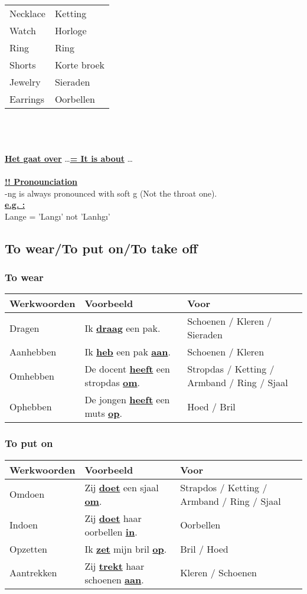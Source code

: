 \documentclass[a4paper,14pt]{extarticle}
\newcommand{\attention}[1]{\underline{\textbf{!! #1}}}
\newcommand{\emp}[1]{\underline{\textbf{#1}}}
\begin{document}
\begin{paracol}{2}
\begin{tabularx}{200pt}{ p{100pt} p{100pt} }
 Necklace & Ketting \\
 Watch & Horloge \\
 Ring & Ring \\
 Shorts & Korte broek \\
 Jewelry & Sieraden \\
 Earrings & Oorbellen \\
\end{tabularx} \\ \\ \\
\emp{Het gaat over} \dots \emp{= It is about} \dots \\ \\
\attention{Pronounciation} \\ 
-ng is always pronounced with soft g (Not the throat one). \\
\emp{e.g. :} \\
Lange = 'Langı' not 'Lanhgı' \\
\end{paracol}
\subsection{To wear/To put on/To take off}
\subsubsection{To wear}
\begin{tabularx}{\textwidth}{ p{} p{} p{} }
 \hline
 Werkwoorden & Voorbeeld & Voor \\
 \hline
 Dragen & Ik \emp{draag} een pak. & Schoenen / Kleren / Sieraden \\
 Aanhebben & Ik \emp{heb} een pak \emp{aan}. & Schoenen / Kleren \\
 Omhebben & De docent \emp{heeft} een stropdas \emp{om}. & Stropdas / Ketting / Armband / Ring / Sjaal \\
 Ophebben & De jongen \emp{heeft} een muts \emp{op}. & Hoed / Bril \\
\end{tabularx}
\newpage
\subsubsection{To put on}
\begin{tabularx}{\textwidth}{ p{} p{} p{} }
 \hline
 Werkwoorden & Voorbeeld & Voor \\
 \hline
 Omdoen & Zij \emp{doet} een sjaal \emp{om}. & Strapdos / Ketting / Armband / Ring / Sjaal \\
 Indoen & Zij \emp{doet} haar oorbellen \emp{in}. & Oorbellen \\
 Opzetten & Ik \emp{zet} mijn bril \emp{op}. & Bril / Hoed \\
 Aantrekken & Zij \emp{trekt} haar schoenen \emp{aan}. & Kleren / Schoenen \\
\end{tabularx}
\end{document}
